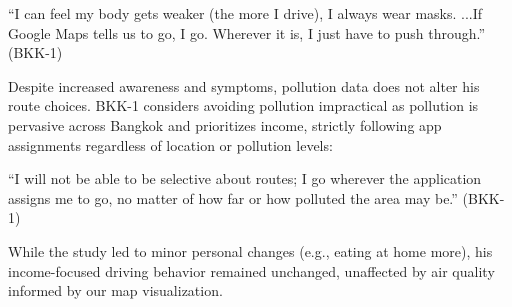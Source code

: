 \begin{quoteb}
    ``I can feel my body gets weaker (the more I drive), I always wear masks. ...If Google Maps tells us to go, I go. Wherever it is, I just have to push through.'' (BKK-1)
\end{quoteb}

Despite increased awareness and symptoms, pollution data does not alter his route choices.
BKK-1 considers avoiding pollution impractical as pollution is pervasive across Bangkok and prioritizes income, strictly following app assignments regardless of location or pollution levels:

\begin{quoteb}
    ``I will not be able to be selective about routes; I go wherever the application assigns me to go, no matter of how far or how polluted the area may be.'' (BKK-1)
\end{quoteb}


While the study led to minor personal changes (e.g., eating at home more), his income-focused driving behavior remained unchanged, unaffected by air quality informed by our map visualization.






